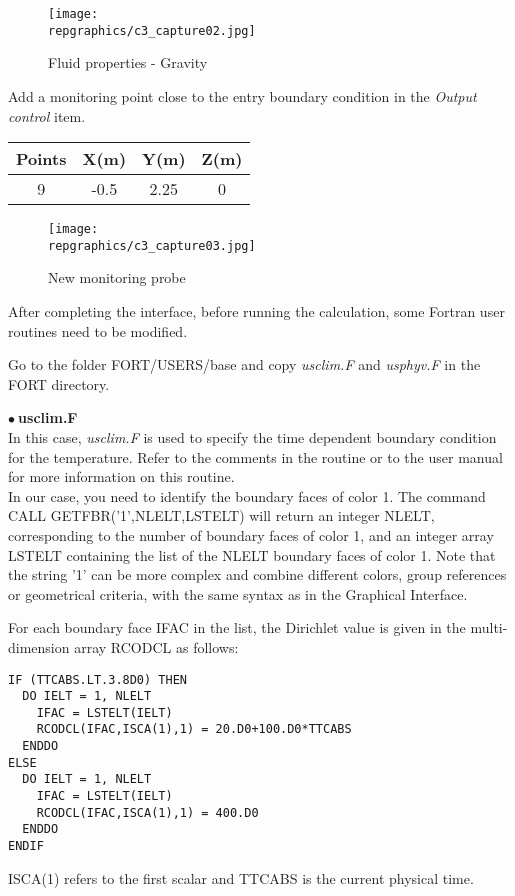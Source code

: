 \begin{figure}[h!]
\begin{center}
\texttt{[image: \\repgraphics/c3\_capture02.jpg]}
\caption{Fluid properties - Gravity}
\label{fig2_e3}
\end{center}
\end{figure}


\newpage
Add a monitoring point close to the entry boundary condition in the
{\itshape Output control} item.

\begin{center}
\begin{tabular}{|c|c|c|c|}
\hline
Points & X(m) & Y(m) & Z(m)\\
\hline
9 & -0.5 & 2.25 & 0 \\
\hline
\end{tabular}
\end{center}

\begin{figure}[h!]
\begin{center}
\texttt{[image: \\repgraphics/c3\_capture03.jpg]}
\caption{New monitoring probe}
\label{fig3_e3}
\end{center}
\end{figure}


\newpage
After completing the interface, before running the calculation,
some Fortran user routines need to be modified.

Go to the folder FORT/USERS/base and copy {\itshape usclim.F} and
{\itshape usphyv.F} in the FORT directory.

$\bullet\ $\textbf{usclim.F}\\
In this case, {\itshape usclim.F} is used to specify the time dependent boundary
condition for
the temperature. Refer to the comments in the routine or to the \CS user manual
for more information on this routine.\\
In our case, you need to identify the boundary faces of color 1. The command\\
CALL GETFBR('1',NLELT,LSTELT)
will return an integer NLELT, corresponding to the number of boundary faces of
color 1, and an integer array LSTELT containing the list of the NLELT boundary
faces of color 1. Note that the string '1' can be more complex and combine
different colors, group references or geometrical criteria, with the same syntax
as in the Graphical Interface.

For each boundary face IFAC in the list, the Dirichlet value is given in the
multi-dimension array RCODCL as follows:
\begin{verbatim}
IF (TTCABS.LT.3.8D0) THEN
  DO IELT = 1, NLELT
    IFAC = LSTELT(IELT)
    RCODCL(IFAC,ISCA(1),1) = 20.D0+100.D0*TTCABS
  ENDDO
ELSE
  DO IELT = 1, NLELT
    IFAC = LSTELT(IELT)
    RCODCL(IFAC,ISCA(1),1) = 400.D0
  ENDDO
ENDIF
\end{verbatim}
ISCA(1) refers to the first scalar and TTCABS is the current physical time.

